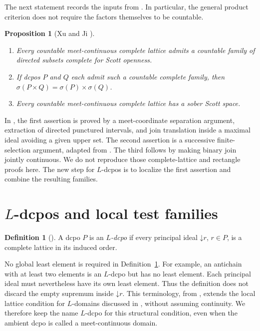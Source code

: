 \documentclass[11pt,reqno]{amsart}
\newtheorem{proposition}[theorem]{Proposition}
\theoremstyle{definition}
\newtheorem{definition}[theorem]{Definition}
\theoremstyle{remark}
\numberwithin{equation}{section}
\newcommand{\down}[1]{\mathord{\downarrow}#1}
\newcommand{\Sc}{\sigma}
\begin{document}
The next statement records the inputs from \cite[Theorem~1.1, Propositions~3.3 and~4.1]{XuJi}. In particular, the general product criterion does not require the factors themselves to be countable.

\begin{proposition}[Xu and Ji {\cite{XuJi}}]\label{prop:lattice-input}
\begin{enumerate}[label=\textup{(\arabic*)}]
\item Every countable meet-continuous complete lattice admits a countable family of directed subsets complete for Scott openness.
\item If dcpos $P$ and $Q$ each admit such a countable complete family, then $\Sc(P\times Q)=\Sc(P)\times\Sc(Q)$.
\item Every countable meet-continuous complete lattice has a sober Scott space.
\end{enumerate}
\end{proposition}

In \cite{XuJi}, the first assertion is proved by a meet-coordinate separation argument, extraction of directed punctured intervals, and join translation inside a maximal ideal avoiding a given upper set. The second assertion is a successive finite-selection argument, adapted from \cite[Lemma~4.1]{Miao}. The third follows by making binary join jointly continuous. We do not reproduce those complete-lattice and rectangle proofs here. The new step for $L$-dcpos is to localize the first assertion and combine the resulting families.

\section{\texorpdfstring{$L$}{L}-dcpos and local test families}\label{sec:local-tests}
\begin{definition}[{\cite[Definition~5.1]{JiaJungLi}}]\label{def:L-dcpo}
A dcpo $P$ is an \emph{$L$-dcpo} if every principal ideal $\down r$, $r\in P$, is a complete lattice in its induced order.
\end{definition}

No global least element is required in Definition~\ref{def:L-dcpo}. For example, an antichain with at least two elements is an $L$-dcpo but has no least element. Each principal ideal must nevertheless have its own least element. Thus the definition does not discard the empty supremum inside $\down r$. This terminology, from \cite{JiaJungLi}, extends the local lattice condition for $L$-domains discussed in \cite[Section~4.1]{AbramskyJung}, without assuming continuity. We therefore keep the name $L$-dcpo for this structural condition, even when the ambient dcpo is called a meet-continuous domain.
\end{document}
